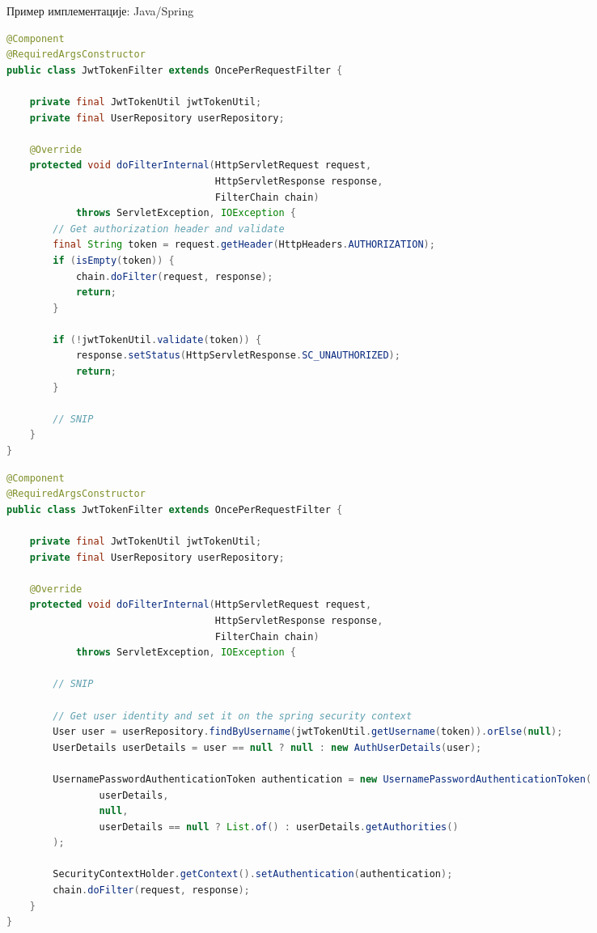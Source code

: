 \documentclass{beamer}
\begin{document}
    \begin{frame}{Пример имплементације: Java/Spring}
        \begin{adjustbox}{width=\textwidth,height=\textheight,keepaspectratio}
			\begin{lstlisting}[language=java]
@Component
@RequiredArgsConstructor
public class JwtTokenFilter extends OncePerRequestFilter {

    private final JwtTokenUtil jwtTokenUtil;
    private final UserRepository userRepository;

    @Override
    protected void doFilterInternal(HttpServletRequest request,
                                    HttpServletResponse response,
                                    FilterChain chain)
            throws ServletException, IOException {
        // Get authorization header and validate
        final String token = request.getHeader(HttpHeaders.AUTHORIZATION);
        if (isEmpty(token)) {
            chain.doFilter(request, response);
            return;
        }

        if (!jwtTokenUtil.validate(token)) {
            response.setStatus(HttpServletResponse.SC_UNAUTHORIZED);
            return;
        }

        // SNIP
    }
}
			\end{lstlisting}
		\end{adjustbox}
		
		\framebreak
		
		\begin{adjustbox}{width=\textwidth,height=\textheight,keepaspectratio}
			\begin{lstlisting}[language=java]
@Component
@RequiredArgsConstructor
public class JwtTokenFilter extends OncePerRequestFilter {

    private final JwtTokenUtil jwtTokenUtil;
    private final UserRepository userRepository;

    @Override
    protected void doFilterInternal(HttpServletRequest request,
                                    HttpServletResponse response,
                                    FilterChain chain)
            throws ServletException, IOException {

        // SNIP
        
        // Get user identity and set it on the spring security context
        User user = userRepository.findByUsername(jwtTokenUtil.getUsername(token)).orElse(null);
        UserDetails userDetails = user == null ? null : new AuthUserDetails(user);

        UsernamePasswordAuthenticationToken authentication = new UsernamePasswordAuthenticationToken(
                userDetails,
                null,
                userDetails == null ? List.of() : userDetails.getAuthorities()
        );

        SecurityContextHolder.getContext().setAuthentication(authentication);
        chain.doFilter(request, response);
    }
}
			\end{lstlisting}
		\end{adjustbox}
    \end{frame}
    
\end{document}
